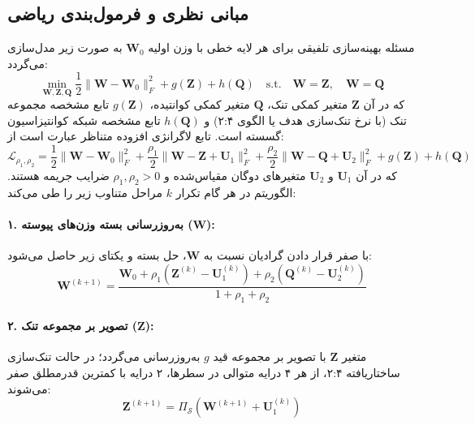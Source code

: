 \subsection{مبانی نظری و فرمول‌بندی ریاضی}
مسئله بهینه‌سازی تلفیقی برای هر لایه خطی با وزن اولیه $\mathbf{W}_0$ به صورت زیر مدل‌سازی می‌گردد:
\begin{equation}
\min_{\mathbf{W}, \mathbf{Z}, \mathbf{Q}} \frac{1}{2} \|\mathbf{W} - \mathbf{W}_0\|_F^2 + g(\mathbf{Z}) + h(\mathbf{Q}) \quad \text{s.t.} \quad \mathbf{W} = \mathbf{Z}, \quad \mathbf{W} = \mathbf{Q}
\end{equation}
که در آن $\mathbf{Z}$ متغیر کمکی تنک، $\mathbf{Q}$ متغیر کمکی کوانتیده، $g(\mathbf{Z})$ تابع مشخصه مجموعه تنک (با نرخ تنک‌سازی هدف یا الگوی ۲:۴) و $h(\mathbf{Q})$ تابع مشخصه شبکه کوانتیزاسیون گسسته است. تابع لاگرانژی افزوده  متناظر عبارت است از:
\begin{equation}
\mathcal{L}_{\rho_1, \rho_2} = \frac{1}{2} \|\mathbf{W} - \mathbf{W}_0\|_F^2 + \frac{\rho_1}{2} \|\mathbf{W} - \mathbf{Z} + \mathbf{U}_1\|_F^2 + \frac{\rho_2}{2} \|\mathbf{W} - \mathbf{Q} + \mathbf{U}_2\|_F^2 + g(\mathbf{Z}) + h(\mathbf{Q})
\end{equation}
که در آن $\mathbf{U}_1$ و $\mathbf{U}_2$ متغیرهای دوگان مقیاس‌شده و $\rho_1, \rho_2 > 0$ ضرایب جریمه هستند. الگوریتم در هر گام تکرار $k$ مراحل متناوب زیر را طی می‌کند:

\paragraph{۱. به‌روزرسانی بسته وزن‌های پیوسته ($\mathbf{W}$):}
با صفر قرار دادن گرادیان نسبت به $\mathbf{W}$، حل بسته و یکتای زیر حاصل می‌شود:
\begin{equation}
\mathbf{W}^{(k+1)} = \frac{\mathbf{W}_0 + \rho_1 (\mathbf{Z}^{(k)} - \mathbf{U}_1^{(k)}) + \rho_2 (\mathbf{Q}^{(k)} - \mathbf{U}_2^{(k)})}{1 + \rho_1 + \rho_2}
\end{equation}

\paragraph{۲. تصویر بر مجموعه تنک ($\mathbf{Z}$):}
متغیر $\mathbf{Z}$ با تصویر بر مجموعه قید $g$ به‌روزرسانی می‌گردد؛ در حالت تنک‌سازی ساختاریافته ۲:۴، از هر ۴ درایه متوالی در سطرها، ۲ درایه با کمترین قدرمطلق صفر می‌شوند:
\begin{equation}
\mathbf{Z}^{(k+1)} = \Pi_{\mathcal{S}}\left(\mathbf{W}^{(k+1)} + \mathbf{U}_1^{(k)}\right)
\end{equation}

